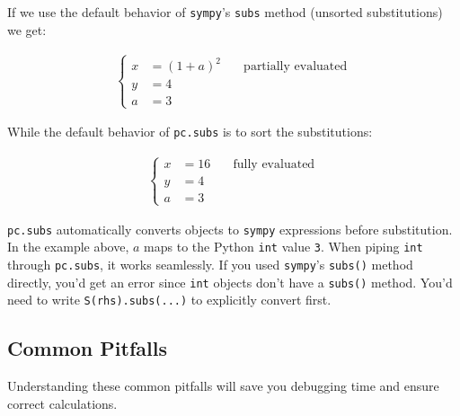 \documentclass[
  letterpaper,
  DIV=11,
  numbers=noendperiod,
  fleqn]{scrartcl}
\begin{document}
If we use the default behavior of \texttt{sympy}'s \texttt{subs} method
(unsorted substitutions) we get:

\begin{align}
    \left\{\begin{aligned}
x & = \left(1 + a\right)^{2} & \quad\text{partially evaluated}  \\[8pt]
 y & = 4 &    \\[8pt]
 a & = 3 &   
    \end{aligned}\right.
\end{align}

While the default behavior of \texttt{pc.subs} is to sort the
substitutions:

\begin{align}
    \left\{\begin{aligned}
x & = 16 & \quad\text{fully evaluated}  \\[8pt]
 y & = 4 &    \\[8pt]
 a & = 3 &   
    \end{aligned}\right.
\end{align}

\begin{tcolorbox}[enhanced jigsaw, colback=white, toprule=.15mm, coltitle=black, arc=.35mm, opacitybacktitle=0.6, rightrule=.15mm, opacityback=0, leftrule=.75mm, titlerule=0mm, colbacktitle=quarto-callout-note-color!10!white, left=2mm, bottomtitle=1mm, breakable, toptitle=1mm, title=\textcolor{quarto-callout-note-color}{\faInfo}\hspace{0.5em}{Note}, bottomrule=.15mm, colframe=quarto-callout-note-color-frame]

\texttt{pc.subs} automatically converts objects to \texttt{sympy}
expressions before substitution. In the example above, \(a\) maps to the
Python \texttt{int} value \texttt{3}. When piping \texttt{int} through
\texttt{pc.subs}, it works seamlessly. If you used \texttt{sympy}'s
\texttt{subs()} method directly, you'd get an error since \texttt{int}
objects don't have a \texttt{subs()} method. You'd need to write
\texttt{S(rhs).subs(...)} to explicitly convert first.

\end{tcolorbox}

\subsection{Common Pitfalls}\label{common-pitfalls}

\begin{tcolorbox}[enhanced jigsaw, colback=white, toprule=.15mm, coltitle=black, arc=.35mm, opacitybacktitle=0.6, rightrule=.15mm, opacityback=0, leftrule=.75mm, titlerule=0mm, colbacktitle=quarto-callout-warning-color!10!white, left=2mm, bottomtitle=1mm, breakable, toptitle=1mm, title=\textcolor{quarto-callout-warning-color}{\faExclamationTriangle}\hspace{0.5em}{Important Patterns to Know}, bottomrule=.15mm, colframe=quarto-callout-warning-color-frame]

Understanding these common pitfalls will save you debugging time and
ensure correct calculations.

\end{tcolorbox}
\end{document}
